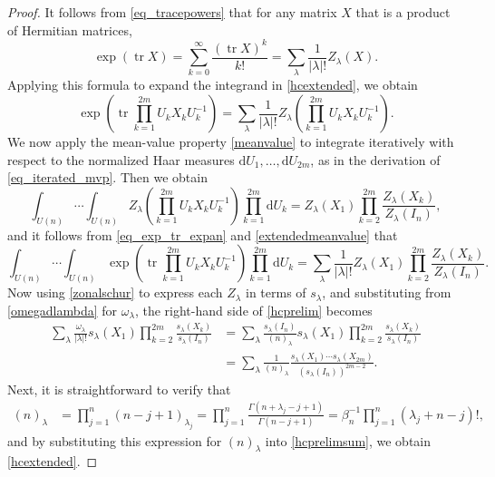 \documentclass[pdftex]{sigma}
\numberwithin{equation}{section}
\def\dd{ \mathrm{d}}
\def\tr{\operatorname{tr} }
\begin{document}
\begin{proof}
It follows from \eqref{eq_tracepowers} that for any matrix $X$ that is a product of Hermitian matrices,
\[
\exp(\tr X) = \sum_{k=0}^\infty \frac{(\tr X)^k}{k!} = \sum_\lambda \frac{1}{|\lambda|!} Z_\lambda(X).
\]
Applying this formula to expand the integrand in \eqref{hcextended}, we obtain
\begin{equation}
\exp\left(\tr \prod_{k=1}^{2m} U_k X_k U_k^{-1}\right) = \sum_\lambda \frac{1}{|\lambda|!} Z_\lambda\left(\prod_{k=1}^{2m} U_k X_k U_k^{-1}\right).\label{eq_exp_tr_expan}
\end{equation}
We now apply the mean-value property \eqref{meanvalue} to integrate iteratively with respect to the normalized Haar measures $\dd U_1,\dots,\dd U_{2m}$, as in the derivation of \eqref{eq_iterated_mvp}. Then we obtain
\begin{equation}
\int_{U(n)} \cdots \int_{U(n)} Z_\lambda\left(\prod_{k=1}^{2m} U_kX_kU_k^{-1}\right) \prod_{k=1}^{2m} \dd U_k = Z_\lambda(X_1) \prod_{k=2}^{2m} \frac{Z_\lambda(X_k)}{Z_\lambda(I_n)},\label{extendedmeanvalue}
\end{equation}
and it follows from \eqref{eq_exp_tr_expan} and \eqref{extendedmeanvalue} that
\begin{equation}
\int_{U(n)} \cdots \int_{U(n)} \exp\left(\tr \prod_{k=1}^{2m} U_kX_kU_k^{-1}\right) \prod_{k=1}^{2m} \dd U_k = \sum_\lambda \frac{1}{|\lambda|!} Z_\lambda(X_1) \prod_{k=2}^{2m} \frac{Z_\lambda(X_k)}{Z_\lambda(I_n)}.\label{hcprelim}
\end{equation}
Now using \eqref{zonalschur} to express each $Z_\lambda$ in terms of $s_\lambda$, and substituting from \eqref{omegadlambda} for $\omega_\lambda$, the right-hand side of \eqref{hcprelim} becomes
\begin{align}
\sum_\lambda \frac{\omega_\lambda}{|\lambda|!} s_\lambda(X_1) \prod_{k=2}^{2m} \frac{s_\lambda(X_k)}{s_\lambda(I_n)}
&= \sum_\lambda \frac{s_\lambda(I_n)}{(n)_\lambda} s_\lambda(X_1) \prod_{k=2}^{2m} \frac{s_\lambda(X_k)}{s_\lambda(I_n)} \nonumber \\
&= \sum_\lambda \frac{1}{(n)_\lambda} \frac{s_\lambda(X_1) \cdots s_\lambda(X_{2m})}{(s_\lambda(I_n))^{2m-2}}.\label{hcprelimsum}
\end{align}
Next, it is straightforward to verify that
\begin{align*}
(n)_\lambda &= \prod_{j=1}^n (n-j+1)_{\lambda_j}
= \prod_{j=1}^n \frac{\Gamma(n+\lambda_j-j+1)}{\Gamma(n-j+1)}
= \beta_n^{-1} \prod_{j=1}^n (\lambda_j+n-j)!,
\end{align*}
and by substituting this expression for $(n)_\lambda$ into \eqref{hcprelimsum}, we obtain \eqref{hcextended}.
\end{proof}
\end{document}
